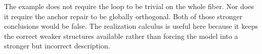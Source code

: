 The example does not require the loop to be trivial on the whole fiber. Nor does it require the anchor repair to be globally orthogonal. Both of those stronger conclusions would be false. The realization calculus is useful here because it keeps the correct weaker structures available rather than forcing the model into a stronger but incorrect description.
